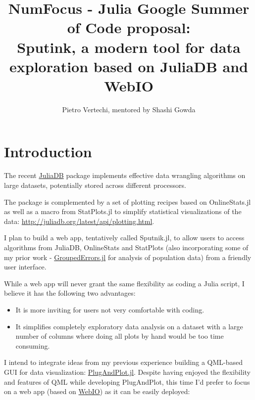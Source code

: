 \documentclass[10pt,a4paper]{report}
\begin{document}
\title{NumFocus - Julia Google Summer of Code proposal:\\
Sputink, a modern tool for data exploration based on JuliaDB and WebIO}
\author{Pietro Vertechi, mentored by Shashi Gowda}


\maketitle

\section*{Introduction}

The recent \href{https://github.com/JuliaComputing/JuliaDB.jl}{JuliaDB} package implements effective data wrangling algorithms on large datasets, potentially stored across different processors.

The package is complemented by a set of plotting recipes based on OnlineStats.jl  as well as a macro from StatPlots.jl to simplify statistical visualizations of the data: \url{http://juliadb.org/latest/api/plotting.html}.

I plan to build a web app, tentatively called Sputnik.jl, to allow users to access algorithms from JuliaDB, OnlineStats and StatPlots (also incorporating some of my prior work - \href{https://github.com/piever/GroupedErrors.jl}{GroupedErrors.jl} for analysis of population data) from a friendly user interface.

While a web app will never grant the same flexibility as coding a Julia script, I believe it has the following two advantages:

\begin{itemize}
    \item It is more inviting for users not very comfortable with coding.
    \item It simplifies completely exploratory data analysis on a dataset with a large number of columns where doing all plots by hand would be too time consuming.
\end{itemize}

I intend to integrate ideas from my previous experience building a QML-based GUI for data visualization: \href{https://github.com/piever/PlugAndPlot.jl}{PlugAndPlot.jl}. Despite having enjoyed the flexibility and features of QML while developing PlugAndPlot, this time I'd prefer to focus on a web app (based on \href{https://github.com/JuliaGizmos/WebIO.jl}{WebIO}) as it can be easily deployed:
\end{document}
